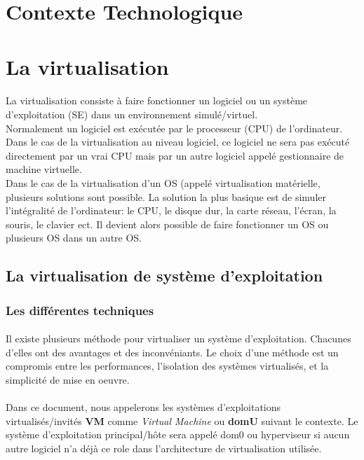 \section{Contexte Technologique}

\section{La virtualisation}
\label{virtualisation}
\paragraph*{}
La virtualisation consiste à faire fonctionner un logiciel ou un système d'exploitation (SE) dans un environnement simulé/virtuel.
\\
Normalement un logiciel est exécutée par le processeur (CPU) de l'ordinateur. Dans le cas de la virtualisation au niveau logiciel,
ce logiciel ne sera pas exécuté directement par un vrai CPU mais par un autre logiciel appelé gestionnaire de machine virtuelle.
\\
Dans le cas de la virtualisation d'un OS (appelé virtualisation matérielle, plusieurs solutions sont possible. La solution la plus basique est de simuler l'intégralité
de l'ordinateur: le CPU, le disque dur, la carte réseau, l'écran, la souris, le clavier ect.
Il devient alors possible de faire fonctionner un OS ou plusieurs OS dans un autre OS.

\subsection{La virtualisation de système d'exploitation}
\label{virtualisation_mat}
\subsubsection{Les différentes techniques}
\paragraph*{}
Il existe plusieurs méthode pour virtualiser un système d'exploitation. Chacunes d'elles ont des avantages et des
inconvéniants. Le choix d'une méthode est un compromis entre les performances, l'isolation des systèmes virtualisés,
et la simplicité de mise en oeuvre.

\paragraph*{}
Dans ce document, nous appelerons les systèmes d'exploitations virtualisés/invités \textbf{VM} comme \emph{Virtual Machine} ou \textbf{domU} suivant le contexte.
Le système d'exploitation principal/hôte sera appelé dom0 ou hyperviseur si aucun autre logiciel n'a déjà ce role dans l'architecture de virtualisation
utilisée.

